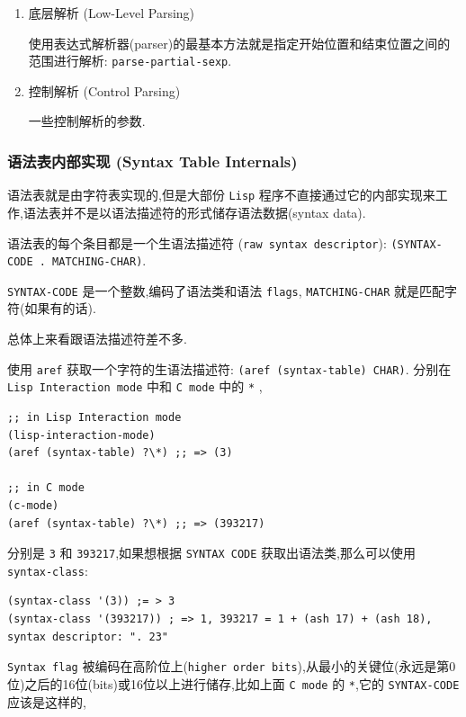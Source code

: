 \documentclass[11pt]{article}
\begin{document}
\begin{enumerate}
\item 底层解析 (Low-Level Parsing)
\label{sec:orgdf5ff66}

使用表达式解析器(parser)的最基本方法就是指定开始位置和结束位置之间的范围进行解析: \texttt{parse-partial-sexp}.


\item 控制解析 (Control Parsing)
\label{sec:org8d6778c}

一些控制解析的参数.
\end{enumerate}



\subsubsection{语法表内部实现 (Syntax Table Internals)}
\label{sec:org7f957c6}

语法表就是由字符表实现的,但是大部份 \texttt{Lisp} 程序不直接通过它的内部实现来工作,语法表并不是以语法描述符的形式储存语法数据(syntax data).

语法表的每个条目都是一个生语法描述符 (\texttt{raw syntax descriptor}): \texttt{(SYNTAX-CODE . MATCHING-CHAR)}.

\texttt{SYNTAX-CODE} 是一个整数,编码了语法类和语法 \texttt{flags}, \texttt{MATCHING-CHAR} 就是匹配字符(如果有的话).

总体上来看跟语法描述符差不多.

使用 \texttt{aref} 获取一个字符的生语法描述符: \texttt{(aref (syntax-table) CHAR)}. 分别在 \texttt{Lisp Interaction mode} 中和 \texttt{C mode} 中的 \texttt{*} ,

\begin{verbatim}
;; in Lisp Interaction mode
(lisp-interaction-mode)
(aref (syntax-table) ?\*) ;; => (3)

;; in C mode
(c-mode)
(aref (syntax-table) ?\*) ;; => (393217)

\end{verbatim}

分别是 \texttt{3} 和 \texttt{393217},如果想根据 \texttt{SYNTAX CODE} 获取出语法类,那么可以使用 \texttt{syntax-class}:

\begin{verbatim}
(syntax-class '(3)) ;= > 3
(syntax-class '(393217)) ; => 1, 393217 = 1 + (ash 17) + (ash 18), syntax descriptor: ". 23"
\end{verbatim}

\texttt{Syntax flag} 被编码在高阶位上(\texttt{higher order bits}),从最小的关键位(永远是第0位)之后的16位(bits)或16位以上进行储存,比如上面 \texttt{C mode} 的 \texttt{*},它的 \texttt{SYNTAX-CODE} 应该是这样的,
\end{document}
